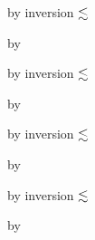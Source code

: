 {\begin{lamportproof*}
    \begin{pfproof}
        \begin{pfproof}
          by inversion $\lesssim$
        \end{pfproof}
      \qedstep
        \begin{pfproof}
          by \pfih
        \end{pfproof}
    \end{pfproof}

    \begin{pfproof}
        \begin{pfproof}
          by inversion $\lesssim$
        \end{pfproof}
      \qedstep
        \begin{pfproof}
          by \pfih
        \end{pfproof}
    \end{pfproof}

    \begin{pfproof}
        \begin{pfproof}
          by inversion $\lesssim$
        \end{pfproof}
      \qedstep
        \begin{pfproof}
          by \pfih
        \end{pfproof}
    \end{pfproof}

    \begin{pfproof}
        \begin{pfproof}
          by inversion $\lesssim$
        \end{pfproof}
      \qedstep
        \begin{pfproof}
          by \pfih
        \end{pfproof}
    \end{pfproof}

\end{lamportproof*}}

